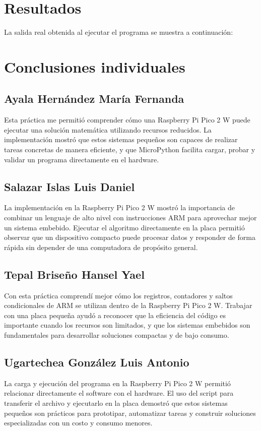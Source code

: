 \documentclass[12pt, letterpaper]{article}
\begin{document}
\section{Resultados}

La salida real obtenida al ejecutar el programa se muestra a continuación:



\section{Conclusiones individuales}

\subsection{Ayala Hernández María Fernanda}

Esta práctica me permitió comprender cómo una Raspberry Pi Pico 2 W puede ejecutar una solución matemática utilizando recursos reducidos. La implementación mostró que estos sistemas pequeños son capaces de realizar tareas concretas de manera eficiente, y que MicroPython facilita cargar, probar y validar un programa directamente en el hardware.

\subsection{Salazar Islas Luis Daniel}

La implementación en la Raspberry Pi Pico 2 W mostró la importancia de combinar un lenguaje de alto nivel con instrucciones ARM para aprovechar mejor un sistema embebido. Ejecutar el algoritmo directamente en la placa permitió observar que un dispositivo compacto puede procesar datos y responder de forma rápida sin depender de una computadora de propósito general.

\subsection{Tepal Briseño Hansel Yael}

Con esta práctica comprendí mejor cómo los registros, contadores y saltos condicionales de ARM se utilizan dentro de la Raspberry Pi Pico 2 W. Trabajar con una placa pequeña ayudó a reconocer que la eficiencia del código es importante cuando los recursos son limitados, y que los sistemas embebidos son fundamentales para desarrollar soluciones compactas y de bajo consumo.

\subsection{Ugartechea González Luis Antonio}

La carga y ejecución del programa en la Raspberry Pi Pico 2 W permitió relacionar directamente el software con el hardware. El uso del script para transferir el archivo y ejecutarlo en la placa demostró que estos sistemas pequeños son prácticos para prototipar, automatizar tareas y construir soluciones especializadas con un costo y consumo menores.

%
\end{document}

